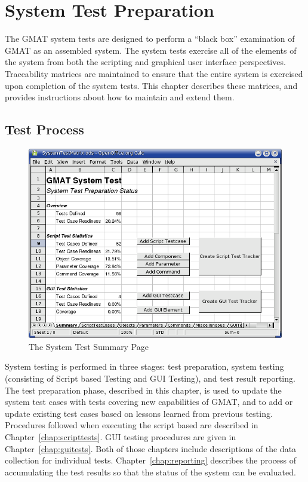 \chapter{\label{chap:testprep}System Test Preparation}

The GMAT system tests are designed to perform a ``black box'' examination of GMAT as an assembled
system.  The system tests exercise all of the elements of the system from both the scripting and
graphical user interface perspectives.  Traceability matrices are maintained to ensure that the
entire system is exercised upon completion of the system tests.  This chapter describes these
matrices, and provides instructions about how to maintain and extend them.

\section{Test Process}

\begin{figure}[htb]
\begin{center}
\includegraphics[400,300]{Images/SystemTestSummary.png}
\caption{\label{figure:SystemTestSummary}The System Test Summary Page}
\end{center}
\end{figure}

System testing is performed in three stages: test preparation, system testing (consisting of Script
based Testing and GUI Testing), and test result reporting.  The test preparation
phase, described in this chapter, is used to update the system test cases with tests covering new
capabilities of GMAT, and to add or update existing test cases based on lessons learned from
previous testing.  Procedures followed when executing the script based are described in
Chapter~\ref{chap:scripttests}.  GUI testing procedures are given in Chapter~\ref{chap:guitests}.
Both of those chapters include descriptions of the data collection for individual tests.
Chapter~\ref{chap:reporting} describes the process of accumulating the test results so that the
status of the system can be evaluated.

